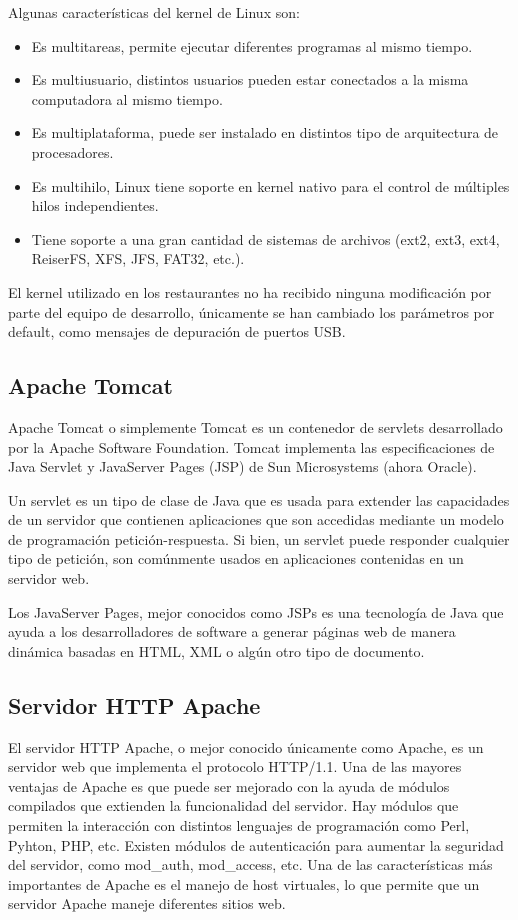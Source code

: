 Algunas características del kernel de Linux son:

\begin{itemize}
 \item Es multitareas, permite ejecutar diferentes programas al mismo tiempo.
 \item Es multiusuario, distintos usuarios pueden estar conectados a la misma computadora al mismo tiempo.
 \item Es multiplataforma, puede ser instalado en distintos tipo de arquitectura de procesadores.
 \item Es multihilo, Linux tiene soporte en kernel nativo para el control de múltiples hilos independientes.
 \item Tiene soporte a una gran cantidad de sistemas de archivos (ext2, ext3, ext4, ReiserFS, XFS, JFS, FAT32, etc.).
\end{itemize}

El kernel utilizado en los restaurantes no ha recibido ninguna modificación por parte del equipo de desarrollo, únicamente se han cambiado los parámetros por default, como mensajes de depuración de puertos USB.

\subsection{Apache Tomcat}
\label{sec:tomcat}

Apache Tomcat o simplemente Tomcat es un contenedor de servlets desarrollado por la Apache Software Foundation. Tomcat implementa las especificaciones de Java Servlet y JavaServer Pages (JSP) de Sun Microsystems (ahora Oracle).

Un servlet es un tipo de clase de Java que es usada para extender las capacidades de un servidor que contienen aplicaciones que son accedidas mediante un modelo de programación petición-respuesta. Si bien, un servlet puede responder cualquier tipo de petición, son comúnmente usados en aplicaciones contenidas en un servidor web.

Los JavaServer Pages, mejor conocidos como JSPs es una tecnología de Java que ayuda a los desarrolladores de software a generar páginas web de manera dinámica basadas en HTML, XML o algún otro tipo de documento.

\subsection{Servidor HTTP Apache}
\label{sec:apache}

El servidor HTTP Apache, o mejor conocido únicamente como Apache, es un servidor web que implementa el protocolo HTTP/1.1. Una de las mayores ventajas de Apache es que puede ser mejorado con la ayuda de módulos compilados que extienden la funcionalidad del servidor. Hay módulos que permiten la interacción con distintos lenguajes de programación como Perl, Pyhton, PHP, etc. Existen módulos de autenticación para aumentar la seguridad del servidor, como mod\_auth, mod\_access, etc. Una de las características más importantes de Apache es el manejo de host virtuales, lo que permite que un servidor Apache maneje diferentes sitios web.

